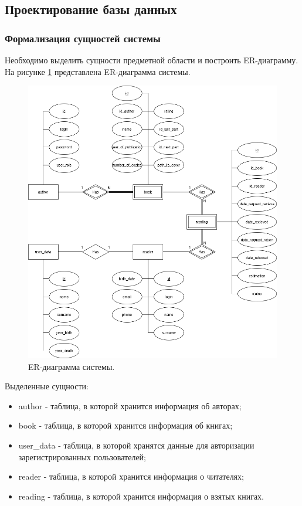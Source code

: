 \subsection{Проектирование базы данных}
\subsubsection{Формализация сущностей системы}
Необходимо выделить сущности предметной области и построить ER-диаграмму. 
На рисунке \ref{img:ER} представлена ER-диаграмма системы.
\begin{figure}[h!]
	\centering
	\includegraphics[scale=0.5]{img/ER.png}
	\caption{ER-диаграмма системы.}
	\label{img:ER}
\end{figure}
\newpage
Выделенные сущности:
\begin{itemize}
	\item[1)] author - таблица, в которой хранится информация об авторах;
	\item[2)] book - таблица, в которой хранится информация об книгах;
	\item[3)] user\_data - таблица, в которой хранятся данные для авторизации зарегистрированных пользователей;
	\item[4)] reader - таблица, в которой хранится информация о читателях;
	\item[5)] reading - таблица, в которой хранится информация о взятых книгах.
\end{itemize}

